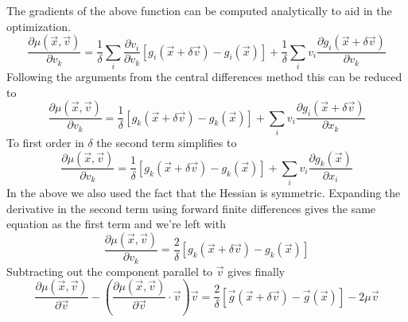 \documentclass[a4paper]{article}
\begin{document}
The gradients of the above function can be computed analytically to aid in the
optimization.
\begin{equation}
\frac{\partial \mu(\vec{x}, \vec{v})} {\partial v_k} = 
\frac{1}{\delta} 
\sum_i \frac{\partial v_i}{\partial v_k}
\left[ g_i(\vec{x} + \delta \vec{v}) 
- g_i(\vec{x}) \right]
+
\frac{1}{\delta} 
\sum_i v_i
\frac{\partial g_i(\vec{x} + \delta \vec{v})}{\partial v_k} 
\end{equation}
Following the arguments from the central differences method this can be reduced
to
\begin{equation}
\frac{\partial \mu(\vec{x}, \vec{v})} {\partial v_k} = 
\frac{1}{\delta} 
\left[ g_k(\vec{x} + \delta \vec{v}) 
- g_k(\vec{x}) \right]
+
\sum_i v_i
\frac{\partial g_i(\vec{x} + \delta \vec{v})}{\partial x_k} 
\end{equation}
To first order in $\delta$ the second term simplifies to
\begin{equation}
\frac{\partial \mu(\vec{x}, \vec{v})} {\partial v_k} = 
\frac{1}{\delta} 
\left[ g_k(\vec{x} + \delta \vec{v}) 
- g_k(\vec{x}) \right]
+
\sum_i v_i
\frac{\partial g_k(\vec{x})}{\partial x_i} 
\end{equation}
In the above we also used the fact that the Hessian is symmetric.  Expanding
the derivative in the second term using forward finite differences gives the
same equation as the first term and we're left with
\begin{equation}
\frac{\partial \mu(\vec{x}, \vec{v})} {\partial v_k} = 
\frac{2}{\delta} 
\left[ g_k(\vec{x} + \delta \vec{v}) 
- g_k(\vec{x}) \right]
\end{equation}
Subtracting out the component parallel to $\vec{v}$ gives finally
\begin{equation}
\frac{\partial \mu(\vec{x}, \vec{v})} {\partial \vec{v}} - 
\left(
\frac{\partial \mu(\vec{x}, \vec{v})} {\partial \vec{v}} \cdot \vec{v}
\right) \vec{v}
= 
\frac{2}{\delta} 
\left[ \vec{g}(\vec{x} + \delta \vec{v}) 
- \vec{g}(\vec{x}) \right]
-
2 \mu \vec{v}
\end{equation}
\end{document}
